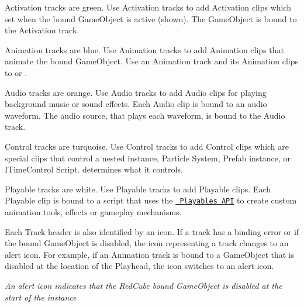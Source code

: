 \begin{DoxyItemize}
\item Activation tracks are green. Use Activation tracks to add Activation clips which set when the bound Game\+Object is active (shown). The Game\+Object is bound to the Activation track.
\item Animation tracks are blue. Use Animation tracks to add Animation clips that animate the bound Game\+Object. Use an Animation track and its Animation clips to  or .
\item Audio tracks are orange. Use Audio tracks to add Audio clips for playing background music or sound effects. Each Audio clip is bound to an audio waveform. The audio source, that plays each waveform, is bound to the Audio track.
\item Control tracks are turquoise. Use Control tracks to add Control clips which are special clips that control a nested  instance, Particle System, Prefab instance, or ITime\+Control Script.  determines what it controls.
\item Playable tracks are white. Use Playable tracks to add Playable clips. Each Playable clip is bound to a script that uses the \href{https://docs.unity3d.com/Manual/Playables.html}{\texttt{ Playables API}} to create custom animation tools, effects or gameplay mechanisms.
\end{DoxyItemize}

Each Track header is also identified by an icon. If a track has a binding error or if the bound Game\+Object is disabled, the icon representing a track changes to an alert icon. For example, if an Animation track is bound to a Game\+Object that is disabled at the location of the Playhead, the icon switches to an alert icon.



{\itshape An alert icon indicates that the Red\+Cube bound Game\+Object is disabled at the start of the  instance} 